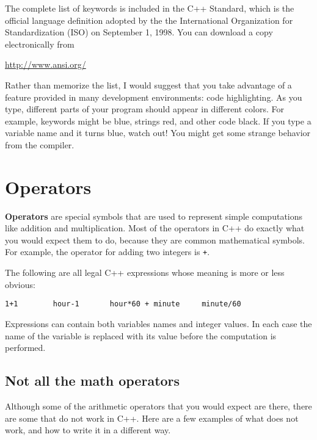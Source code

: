 The complete list of keywords is included in the C++ Standard, which
is the official language definition adopted by the the International
Organization for Standardization (ISO) on September 1, 1998.  You
can download a copy electronically from

    \url{http://www.ansi.org/}

%
Rather than memorize the list, I would suggest that you
take advantage of a feature provided in many development
environments: code highlighting.  As you type, different
parts of your program should appear in different colors.  For
example, keywords might be blue, strings red, and other code
black.  If you type a variable name and it turns blue, watch
out!  You might get some strange behavior from the compiler.

\section{Operators}

{\bf Operators} are special symbols that are used to represent
simple computations like addition and multiplication.  Most
of the operators in C++ do exactly what you would expect them
to do, because they are common mathematical symbols.  For
example, the operator for adding two integers is {\tt +}.

The following are all legal C++ expressions whose meaning is
more or less obvious:

\begin{verbatim}
1+1        hour-1       hour*60 + minute     minute/60
\end{verbatim}
%
Expressions can contain both variables
names and integer values.  In each case the name of the variable is
replaced with its value before the computation is performed.


\subsection{Not all the math operators}
Although some of the arithmetic operators that you would expect are there, there are some that do not work in C++. Here are a few examples of what does not work, and how to write it in a different way.


